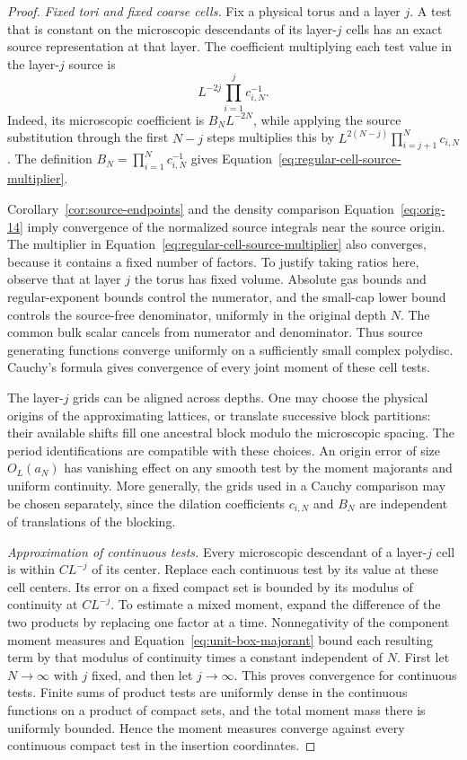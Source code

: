 \begin{proof}
\emph{Fixed tori and fixed coarse cells.}
Fix a physical torus and a layer $j$.  A test that is constant on the
microscopic descendants of its layer-$j$ cells has an exact source
representation at that layer.  The coefficient multiplying each test
value in the layer-$j$ source is
\begin{equation}
             L^{-2j}\prod_{i=1}^j c_{i,N}^{-1}.
 \label{eq:regular-cell-source-multiplier}
\end{equation}
Indeed, its microscopic coefficient is $B_NL^{-2N}$, while applying the
source substitution through the first $N-j$ steps multiplies this by
$L^{2(N-j)}\prod_{i=j+1}^N c_{i,N}$.  The definition
$B_N=\prod_{i=1}^Nc_{i,N}^{-1}$ gives
Equation~\eqref{eq:regular-cell-source-multiplier}.

Corollary~\ref{cor:source-endpoints} and the density comparison
Equation~\eqref{eq:orig-14} imply convergence of the normalized source
integrals near the source origin.  The multiplier in
Equation~\eqref{eq:regular-cell-source-multiplier} also converges,
because it contains a fixed number of factors.  To justify taking
ratios here, observe that at layer $j$ the torus has fixed volume.
Absolute gas bounds and regular-exponent bounds control the numerator,
and the small-cap lower bound controls the source-free denominator,
uniformly in the original depth $N$.  The common bulk scalar cancels
from numerator and denominator.  Thus source generating functions
converge uniformly on a sufficiently small complex polydisc.  Cauchy's
formula gives convergence of every joint moment of these cell tests.

The layer-$j$ grids can be aligned across depths.  One may choose the
physical origins of the approximating lattices, or translate successive
block partitions: their available shifts fill one ancestral block
modulo the microscopic spacing.  The period identifications are
compatible with these choices.  An origin error of size $O_L(a_N)$
has vanishing effect on any smooth test by the moment majorants and
uniform continuity.  More generally, the grids used in a Cauchy
comparison may be chosen separately, since the dilation coefficients
$c_{i,N}$ and $B_N$ are independent of translations of the blocking.

\emph{Approximation of continuous tests.}
Every microscopic descendant of a layer-$j$ cell is within
$CL^{-j}$ of its center.  Replace each continuous test by its value at
these cell centers.  Its error on a fixed compact set is bounded by
its modulus of continuity at $CL^{-j}$.  To estimate a mixed moment,
expand the difference of the two products by replacing one factor at
a time.  Nonnegativity of the component moment measures and
Equation~\eqref{eq:unit-box-majorant} bound each resulting term by that
modulus of continuity times a constant independent of $N$.  First let
$N\to\infty$ with $j$ fixed, and then let $j\to\infty$.  This proves
convergence for continuous tests.  Finite sums of product tests are
uniformly dense in the continuous functions on a product of compact
sets, and the total moment mass there is uniformly bounded.  Hence the
moment measures converge against every continuous compact test in the
insertion coordinates.


\end{proof}
